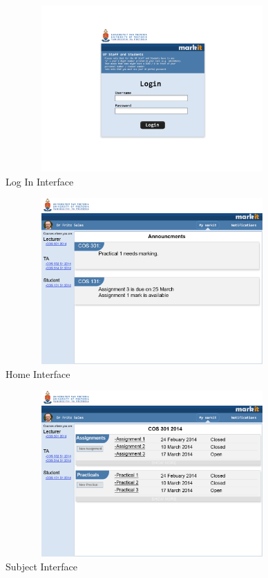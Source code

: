 \documentclass[12pt]{article}
\begin{document}
			\begin{center}
			
			
						\begin{figure}[h]
										\centering
										\includegraphics[width=5in, height=2.5in]{Pictures/Screens/Desktop/01logon.jpg}
										\caption{Log In Interface}
						\end{figure}
						\FloatBarrier
						
						\begin{figure}[h]
										\centering
										\includegraphics[width=5in, height=2.5in]{Pictures/Screens/Desktop/02homePage.jpg}
										\caption{Home Interface}
						\end{figure}
						\FloatBarrier
						
						\begin{figure}[h]
										\centering
										\includegraphics[width=5in, height=2.5in]{Pictures/Screens/Desktop/03subject.jpg}
										\caption{Subject Interface}
						\end{figure}
						\FloatBarrier
						

\end{center}
\end{document}
